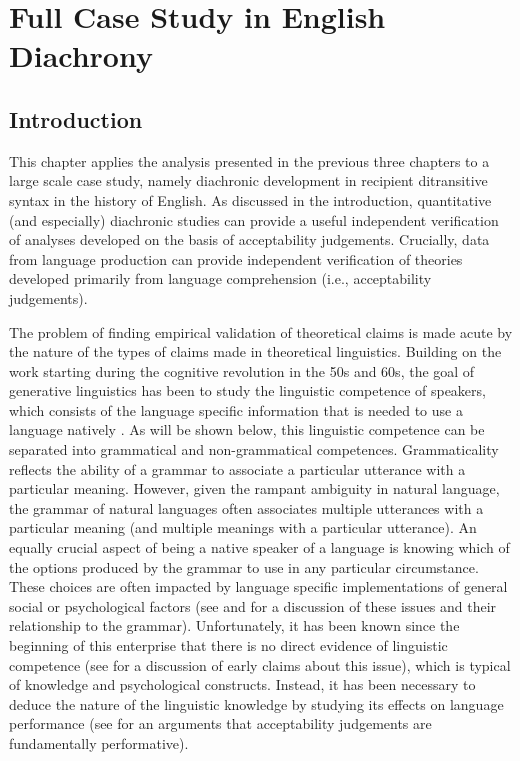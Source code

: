 \chapter{Full Case Study in English Diachrony}\label{ch:diachron}
\section{Introduction}
This chapter applies the analysis presented in the previous three chapters to a large scale case study, namely diachronic development in recipient ditransitive syntax in the history of English. As discussed in the introduction, quantitative (and especially) diachronic studies can provide a useful independent verification of analyses developed on the basis of acceptability judgements. Crucially, data from language production can provide independent verification of theories developed primarily from language comprehension (i.e., acceptability judgements).

The problem of finding empirical validation of theoretical claims is made acute by the nature of the types of claims made in theoretical linguistics. Building on the work starting during the cognitive revolution in the 50s and 60s, the goal of generative linguistics has been to study the linguistic competence of speakers, which consists of the language specific information that is needed to use a language natively \citep{Chomsky.1981,Chomsky.1986}. As will be shown below, this linguistic competence can be separated into grammatical and non-grammatical competences. Grammaticality reflects the ability of a grammar to associate a particular utterance with a particular meaning. However, given the rampant ambiguity in natural language, the grammar of natural languages often associates multiple utterances with a particular meaning (and multiple meanings with a particular utterance). An equally crucial aspect of being a native speaker of a language is knowing which of the options produced by the grammar to use in any particular circumstance. These choices are often impacted by language specific implementations of general social or psychological factors (see \cite{Bresnan.2007,Bresnan.2010,Zeevat.2014} and \cite{Tamminga.2016} for a discussion of these issues and their relationship to the grammar). Unfortunately, it has been known since the beginning of this enterprise that there is no direct evidence of linguistic competence (see \cite{Schutze.1996} for a discussion of early claims about this issue), which is typical of knowledge and psychological constructs. Instead, it has been necessary to deduce the nature of the linguistic knowledge by studying its effects on language performance (see \citealt{Stroud.2012,Phillips.2013, Phillips.2013b, Phillips.2013c} for an arguments that acceptability judgements are fundamentally performative).

